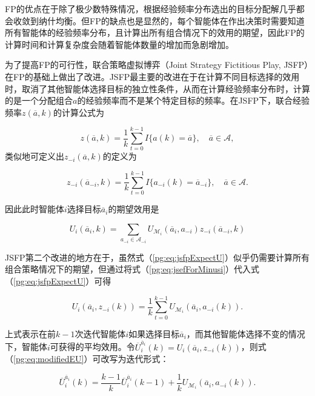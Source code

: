 FP的优点在于除了极少数特殊情况，根据经验频率分布选出的目标分配解几乎都会收敛到纳什均衡。但FP的缺点也是显然的，每个智能体在作出决策时需要知道所有智能体的经验频率分布，且计算出所有组合情况下的效用的期望，因此FP的计算时间和计算复杂度会随着智能体数量的增加而急剧增加。

为了提高FP的可行性，联合策略虚拟博弈（Joint Strategy Fictitious Play, JSFP）在FP的基础上做出了改进。JSFP最主要的改进在于在计算不同目标选择的效用时，取消了其他智能体选择目标的独立性条件，从而在计算经验频率分布时，计算的是一个分配组合$a$的经验频率而不是某个特定目标的频率。在JSFP下，联合经验频率$z(\overline a,k)$的计算公式为

\begin{equation}
\label{pg:eq:jsef}
	z(\overline a,k) = \frac{1}{k} \sum_{t=0}^{k-1} I\{a(k) = \overline a\},\quad \overline a \in \mathcal{A},
\end{equation}
类似地可定义出$z_{-i}(\overline a,k)$的定义为

\begin{equation}
\label{pg:eq:jsefForMinusi}
	z_{-i}(\overline a_{-i},k) = \frac{1}{k} \sum_{t=0}^{k-1} I\{a_{-i}(k) = \overline a_{-i}\},\quad \overline a \in \mathcal{A}.
\end{equation}

因此此时智能体$i$选择目标$\overline a_i$的期望效用是

\begin{equation}
\label{pg:eq:jsfpExpectU}
	U_i(\overline a_i,k) = \sum_{a_{-i} \in \mathcal{A}_{-i}} U_{\mathcal{M}_i}(\overline a_i,a_{-i}) z_{-i}(\overline a_{-i},k)
\end{equation}

JSFP第二个改进的地方在于，虽然式（\ref{pg:eq:jsfpExpectU}）似乎仍需要计算所有组合策略情况下的期望，但通过将式（\ref{pg:eq:jsefForMinusi}）代入式（\ref{pg:eq:jsfpExpectU}）可得

\begin{equation}
\label{pg:eq:modifiedEU}
	U_i(\overline a_i, z_{-i}(k)) = \frac{1}{k}\sum_{t=0}^{k-1} U_{\mathcal{M}_i}(\overline a_i, a_{-i}(k)).
\end{equation}

上式表示在前$k-1$次迭代智能体$i$如果选择目标$\overline a_i$，而其他智能体选择不变的情况下，智能体$i$可获得的平均效用。令$\overline U_i^{\overline a_i}(k)=U_i(\overline a_i, z_{-i}(k))$，则式（\ref{pg:eq:modifiedEU}）可改写为迭代形式：

\begin{equation}
\label{pg:eq:recurJSFP}
	\overline U_i^{\overline a_i}(k) = \frac{k-1}{k} \overline U_i^{\overline a_i}(k-1) + \frac{1}{k} U_{\mathcal{M}_i}(\overline a_i, a_{-i}(k)).
\end{equation}

